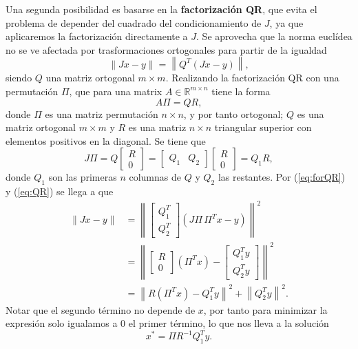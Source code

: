 \documentclass[11pt,a4paper]{book}
\theoremstyle{definition}
\theoremstyle{remark}
\newcommand{\norm}[1]{\left\lVert#1\right\rVert}
\begin{document}
Una segunda posibilidad es basarse en la \textbf{factorización QR}, que evita el problema de depender del cuadrado del condicionamiento de $J$, ya que aplicaremos la factorización directamente a $J$. Se aprovecha que la norma euclídea no se ve afectada por trasformaciones ortogonales para partir de la igualdad
\begin{equation}\label{eq:forQR}
	\norm{Jx- y} = \norm{Q^T(Jx-y)}, 
\end{equation}
siendo $Q$ una matriz ortogonal $m \times m$. Realizando la factorización QR
con una permutación $\Pi$, que
para una matrix $A \in \mathbb{R}^{m \times n}$ tiene la forma
\begin{equation}
	A\Pi = QR,
\end{equation}
donde $\Pi$ es una matriz permutación $n \times n$, y por tanto ortogonal; $Q$ es una matriz
ortogonal $m \times m$ y $R$ es una matriz $n \times n$ triangular superior con elementos positivos en la diagonal. Se tiene que
\begin{equation}\label{eq:QR}
J\Pi = Q \left[ \begin{array}{c} R \\ 0 \end{array} \right] =
\left[ \begin{array}{cc} Q_1 & Q_2 \end{array} \right] \left[ \begin{array}{c} R \\ 0 \end{array} \right] = Q_1 R,
\end{equation}
donde $Q_1$ son las primeras $n$ columnas de $Q$ y $Q_2$ las restantes. Por
(\ref{eq:forQR}) y (\ref{eq:QR}) se llega a que
\begin{equation}
\begin{split}
	\norm{Jx- y} &= \norm{
		\left[ \begin{array}{c} Q_1^T \\ Q_2^T \end{array} \right]
		(J\Pi\,\Pi^Tx-y)
		}^2 \\
	&= \norm{
		\left[ \begin{array}{c} R \\ 0 \end{array} \right]
		(\Pi^Tx)-\left[ \begin{array}{c} Q_1^Ty \\ Q_2^Ty \end{array} \right]
		}^2 \\
	&= \norm{R(\Pi^Tx)-Q_1^Ty}^2 + \norm{Q_2^Ty}^2.
\end{split}
\end{equation}
Notar que el segundo término no depende de $x$, por tanto para minimizar la expresión solo igualamos a 0 el primer término, lo que nos lleva a la solución
\begin{equation}
	x^* = \Pi R^{-1}Q_1^Ty.
\end{equation}
\end{document}
